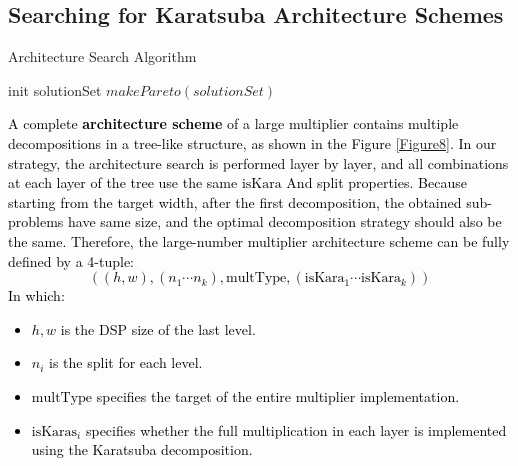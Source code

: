 \documentclass[conference]{IEEEtran}
\begin{document}
\subsection{Searching for Karatsuba Architecture Schemes}    %
\begin{algorithm}[ht]
    \caption{Architecture Search Algorithm} %
    \label{alg2}
	\LinesNumbered %
    init solutionSet \;
    $makePareto(solutionSet)$ \;
\end{algorithm}


\textcolor{black}{
A complete \textbf{architecture scheme} of a large multiplier contains multiple decompositions in a tree-like structure, as shown in the Figure \ref{Figure8}. In our strategy, the architecture search is performed layer by layer, and all combinations at each layer of the tree use the same $\text{isKara}$ And split properties. Because starting from the target width, after the first decomposition, the obtained sub-problems have same size, and the optimal decomposition strategy should also be the same. Therefore, the large-number multiplier architecture scheme can be fully defined by a 4-tuple:
\begin{equation}
    ((h,w), (n_1 \cdots n_{k}), \text{multType}, (\text{isKara}_1 \cdots \text{isKara}_k))
\end{equation}
In which:
\begin{itemize}
    \item $h,w$ is the DSP size of the last level.
    \item $n_i$ is the split for each level.
    \item $\text{multType} $ specifies the target of the entire multiplier implementation.
    \item $\text{isKaras}_i$ specifies whether the full multiplication in each layer is implemented using the Karatsuba decomposition.
\end{itemize}
}
\end{document}
